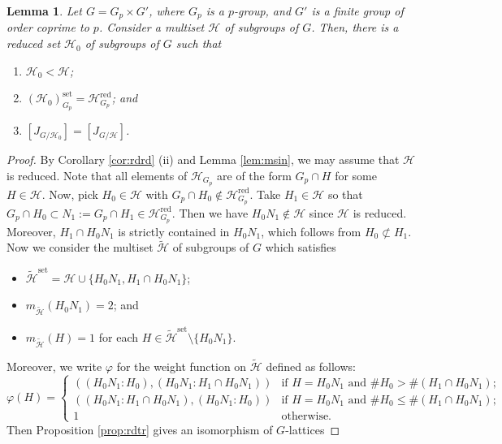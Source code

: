 \documentclass[12pt]{amsart}
\theoremstyle{plain}
\newtheorem{lem}[thm]{Lemma}
\theoremstyle{definition}
\numberwithin{thm}{section}
\numberwithin{equation}{section}
\newcommand{\cH}{\mathcal{H}}
\DeclareMathOperator{\red}{red}
\DeclareMathOperator{\set}{set}
\begin{document}
\begin{lem}\label{lem:psdp}
Let $G=G_{p}\times G'$, where $G_{p}$ is a $p$-group, and $G'$ is a finite group of order coprime to $p$. Consider a multiset $\cH$ of subgroups of $G$. Then, there is a reduced set $\cH_{0}$ of subgroups of $G$ such that
\begin{enumerate}
\item $\cH_{0}<\cH$; 
\item $(\cH_{0})_{G_{p}}^{\set}=\cH_{G_{p}}^{\red}$; and
\item $[J_{G/\cH_{0}}]=[J_{G/\cH}]$. 
\end{enumerate}
\end{lem}

\begin{proof}
By Corollary \ref{cor:rdrd} (ii) and Lemma \ref{lem:msin}, we may assume that $\cH$ is reduced. 
Note that all elements of $\cH_{G_{p}}$ are of the form $G_{p}\cap H$ for some $H\in \cH$. Now, pick $H_{0}\in \cH$ with $G_{p}\cap H_{0}\notin \cH_{G_{p}}^{\red}$. Take $H_{1}\in \cH$ so that $G_{p}\cap H_{0}\subset N_{1}:=G_{p}\cap H_{1}\in \cH_{G_{p}}^{\red}$. Then we have $H_{0}N_{1}\notin \cH$ since $\cH$ is reduced. Moreover, $H_{1}\cap H_{0}N_{1}$ is strictly contained in $H_{0}N_{1}$, which follows from $H_{0} \not\subset H_{1}$. Now we consider the multiset $\widetilde{\cH}$ of subgroups of $G$ which satisfies 
\begin{itemize}
\item $\widetilde{\cH}^{\set}=\cH \cup \{H_{0}N_{1},H_{1}\cap H_{0}N_{1}\}$; 
\item $m_{\widetilde{\cH}}(H_{0}N_{1})=2$; and
\item $m_{\widetilde{\cH}}(H)=1$ for each $H\in \widetilde{\cH}^{\set}\setminus \{H_{0}N_{1}\}$. 
\end{itemize}
Moreover, we write $\varphi$ for the weight function on $\widetilde{\cH}$ defined as follows: 
\begin{equation*}
\varphi(H)=
\begin{cases}
((H_{0}N_{1}:H_{0}),(H_{0}N_{1}:H_{1}\cap H_{0}N_{1}))&\text{if $H=H_{0}N_{1}$ and $\#H_{0}>\#(H_{1}\cap H_{0}N_{1})$;}\\
((H_{0}N_{1}:H_{1}\cap H_{0}N_{1}),(H_{0}N_{1}:H_{0}))&\text{if $H=H_{0}N_{1}$ and $\#H_{0}\leq \#(H_{1}\cap H_{0}N_{1})$; }\\
1&\text{otherwise. }
\end{cases}
\end{equation*}
Then Proposition \ref{prop:rdtr} gives an isomorphism of $G$-lattices

\end{proof}
\end{document}
